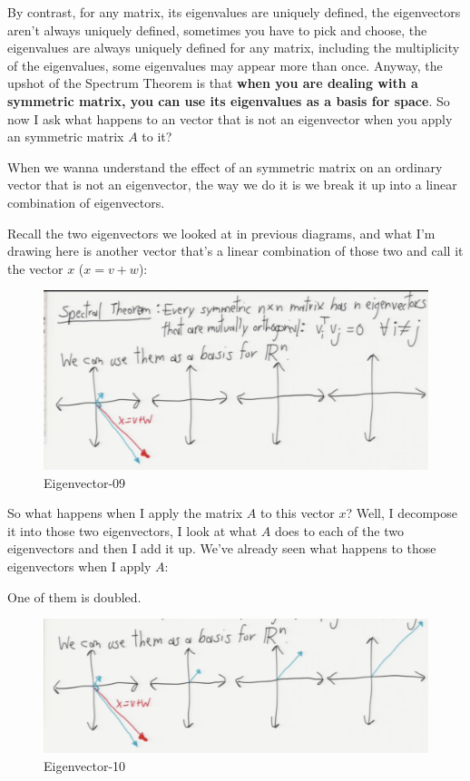 \documentclass[fleqn,10pt]{olplainarticle}
\theoremstyle{definition}
\theoremstyle{remark}
\begin{document}
By contrast, for any matrix, its eigenvalues are uniquely defined, the eigenvectors aren't always uniquely defined, sometimes you have to pick and choose, the eigenvalues are always uniquely defined for any matrix, including the multiplicity of the eigenvalues, some eigenvalues may appear more than once. Anyway, the upshot of the Spectrum Theorem is that \textbf{when you are dealing with a symmetric matrix, you can use its eigenvalues as a basis for space}. So now I ask what happens to an vector that is not an eigenvector when you apply an symmetric matrix $A$ to it?

When we wanna understand the effect of an symmetric matrix on an ordinary vector that is not an eigenvector, the way we do it is we break it up into a linear combination of eigenvectors. 

Recall the two eigenvectors we looked at in previous diagrams, and what I'm drawing here is another vector that's a linear combination of those two and call it the vector $x$ ($x = v + w$):

\begin{figure}[ht]
\centering
\includegraphics[width=1.0\linewidth]{images/chpt08-09}
\caption{Eigenvector-09}
\label{fig:chpt08-09}
\end{figure}

So what happens when I apply the matrix $A$ to this vector $x$? Well, I decompose it into those two eigenvectors, I look at what $A$ does to each of the two eigenvectors and then I add it up. We've already seen what happens to those eigenvectors when I apply $A$:
\clearpage

One of them is doubled. 
\begin{figure}[ht]
\centering
\includegraphics[width=1.0\linewidth]{images/chpt08-10}
\caption{Eigenvector-10}
\label{fig:chpt08-10}
\end{figure}
\end{document}
